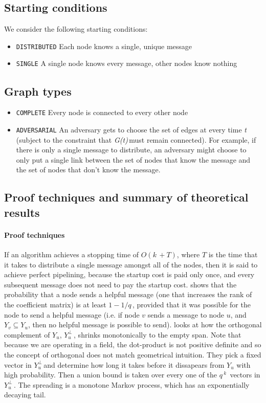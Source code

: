 \documentclass{article} %
\def\graph{\textit{G(t)}\,}
\def\graphtime{\textit{t}\,}
\def\numMessages{\textit{k}\,}
\def\fieldSize{\textit{q}\,}
\def\dualSpace{$Y_u^{\perp}$\,}
\begin{document}
\subsection{Starting conditions}\label{subsec:startingconditions}
We consider the following starting conditions:
\begin{itemize}
\item \texttt{DISTRIBUTED} Each node knows a single, unique message
\item \texttt{SINGLE} A single node knows every message, other nodes know nothing
\end{itemize}

\subsection{Graph types}
\begin{itemize}
\item \texttt{COMPLETE} Every node is connected to every other node
\item \texttt{ADVERSARIAL} An adversary gets to choose the set of edges at every time \graphtime (subject to the constraint that \graph must remain connected). For example, if there is only a single message to distribute, an adversary might choose to only put a single link between the set of nodes that know the message and the set of nodes that don't know the message. 
\end{itemize}

\subsection{Proof techniques and summary of theoretical results}
\paragraph{Proof techniques}
If an algorithm achieves a stopping time of $O(\numMessages + T)$, where $T$ is the time that it takes to distribute a single message amongst all of the nodes, then it is said to achieve perfect pipelining, because the startup cost is paid only once, and every subsequent message does not need to pay the startup cost.
\cite{deb2006algebraic} shows that the probability that a node sends a helpful message (one that increases the rank of the coefficient matrix) is at least $1 - 1/\fieldSize$, provided that it was possible for the node to send a helpful message (i.e. if node $v$ sends a message to node $u$, and $Y_v \subseteq Y_u$, then no helpful message is possible to send). 
\cite{haeupler2011analyzing} looks at how the orthogonal complement of $Y_u$, \dualSpace, shrinks monotonically to the empty span. Note that because we are operating in a field, the dot-product is not positive definite and so the concept of orthogonal does not match geometrical intuition. They pick a fixed vector in \dualSpace and determine how long it takes before it dissapears from $Y_u$ with high probability. Then a union bound is taken over every one of the $\fieldSize^{\numMessages}$ vectors in \dualSpace. The spreading is a monotone Markov process, which has an exponentially decaying tail. 
\end{document}
